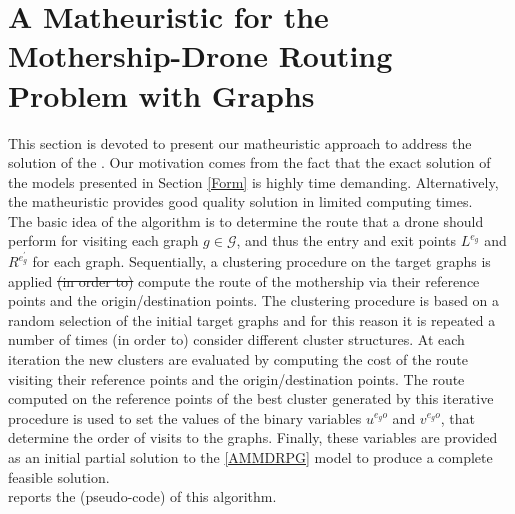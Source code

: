 \section{A Matheuristic for the Mothership-Drone Routing Problem with Graphs}\label{Math}
\noindent
This section is devoted to present our matheuristic approach to address the solution of the \AMD. Our motivation comes from the fact that the exact solution of the models presented in Section \ref{Form} is highly time demanding. Alternatively, the matheuristic provides  good quality solution in limited computing times.\\
\noindent
The basic idea of the algorithm is to determine the route that a drone should perform for visiting each graph $g \in \mathcal{G}$, and thus the entry and exit points $L^{e_{g}}$ and $R^{e^{'}_{g}}$ for each graph.
Sequentially, a clustering procedure on the target graphs is applied \sout{(in order to)}  compute the route of the mothership via their reference points and the origin/destination points.
The clustering procedure is based on a random selection of the initial target graphs and for this reason it is repeated a number of times (in order to)  consider different cluster structures. At each iteration\RE{,} the new clusters are evaluated by computing the cost of the route visiting their reference points and the origin/destination points. 
The route computed on the reference points of the best cluster generated by this iterative procedure is used to set the values of the binary variables $u^{e_go}$ and $v^{e_go}$, that determine the order of visits to the graphs. Finally, these variables are provided as an initial partial solution to the \ref{AMMDRPG} model to produce a complete feasible solution.\\
 reports the (pseudo-code)  of this algorithm.

